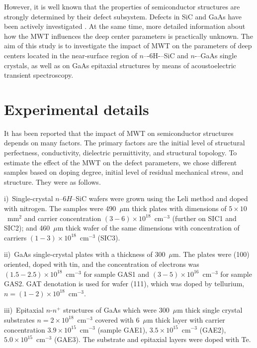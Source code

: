\documentclass[10pt]{iopart}
\begin{document}
However, it is well known that the properties of semiconductor structures are strongly determined by their defect subsystem.
Defects in SiC and GaAs have been actively investigated \cite{SiCDavid,SiCWei,GAPel2020,GASobolev2020}.
At the same time,
more detailed information about how the MWT influences the deep center parameters is practically unknown.
The aim of this study is to investigate the impact of MWT on the parameters of deep centers located in the near-surface region of $n$–-6H-–SiC and $n$-–GaAs single crystals,
as well as on  GaAs  epitaxial structures by means of acoustoelectric  transient spectroscopy.

\section{Experimental details}\label{sec:Exp}

It has been reported \cite{BoltovetsEn,Milenin1994En,BelyaevIntac,ASHKINADZE1996,ProcSPIE} that
the impact of MWT on semiconductor structures depends on many factors.
The primary factors are the initial level of structural perfectness, conductivity, dielectric permittivity, and structural topology.
To estimate the effect of the MWT on the defect parameters, we chose different samples based on doping degree, initial level of residual mechanical stress, and structure.
They were as follows.

\noindent
i)~Single-crystal $n$--6$H$--SiC wafers were grown using the Leli method and doped with nitrogen.
   The samples were  490~$\mu$m thick plates with dimensions of $5\times10$~mm$^2$ and  carrier concentration $(3-6)\times10^{18}$~cm$^{-3}$
    (further on SIC1 and SIC2);
    and 460~$\mu$m thick wafer of the same dimensions with concentration of carriers $(1-3)\times10^{18}$~cm$^{-3}$ (SIC3).

\noindent
ii)~GaAs single-crystal plates with a thickness of 300~$\mu$m.
   The plates were (100) oriented, doped with tin, and the concentration of electrons was $(1.5-2.5)\times10^{18}$~cm$^{-3}$
   for sample  GAS1 and $(3-5)\times10^{16}$~cm$^{-3}$ for sample GAS2.
   GAT denotation is used for wafer (111), which was doped by tellurium,  $n = (1-2)\times10^{18}$~cm$^{-3}$.

\noindent
iii)~Epitaxial $n$-$n^+$ structures of GaAs which were 300~$\mu$m thick single crystal substrates $n = 2 \times10^{18}$~cm$^{-3}$
   covered with 6~$\mu$m thick layer with carrier concentration $3.9\times10^{15}$~cm$^{-3}$
   (sample GAE1), $3.5\times10^{15}$~cm$^{-3}$ (GAE2),
   $5.0\times10^{15}$~cm$^{-3}$ (GAE3).
   The substrate and epitaxial layers were doped with Te.
\end{document}
